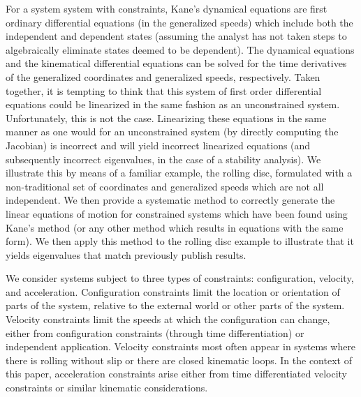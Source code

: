 \documentclass[smallcondensed,final]{svjour3}                     %
\begin{document}
For a system system with constraints, Kane's dynamical equations\cite{Kane195}
are first ordinary differential equations (in the generalized speeds) which
include both the independent and dependent states (assuming the analyst has not
taken steps to algebraically eliminate states deemed to be dependent). The
dynamical equations and the kinematical differential equations can be solved
for the time derivatives of the generalized coordinates and generalized speeds,
respectively. Taken together, it is tempting to think that this system of first
order differential equations could be linearized in the same fashion as an
unconstrained system. Unfortunately, this is not the case. Linearizing these
equations in the same manner as one would for an unconstrained system (by
directly computing the Jacobian) is incorrect and will yield incorrect
linearized equations (and subsequently incorrect eigenvalues, in the case of a
stability analysis). We illustrate this by means of a familiar example, the
rolling disc, formulated with a non-traditional set of coordinates and
generalized speeds which are not all independent. We then provide a systematic
method to correctly generate the linear equations of motion for constrained
systems which have been found using Kane's method (or any other method which
results in equations with the same form). We then apply this method to the
rolling disc example to illustrate that it yields eigenvalues that match
previously publish results.

We consider systems subject to three types of constraints: configuration,
velocity, and acceleration.  Configuration constraints limit the location or
orientation of parts of the system, relative to the external world or other
parts of the system.  Velocity constraints limit the speeds at which the
configuration can change, either from configuration constraints (through time
differentiation) or independent application.  Velocity constraints most often
appear in systems where there is rolling without slip or there are closed
kinematic loops.  In the context of this paper, acceleration constraints arise
either from time differentiated velocity constraints or similar kinematic
considerations.
\end{document}
